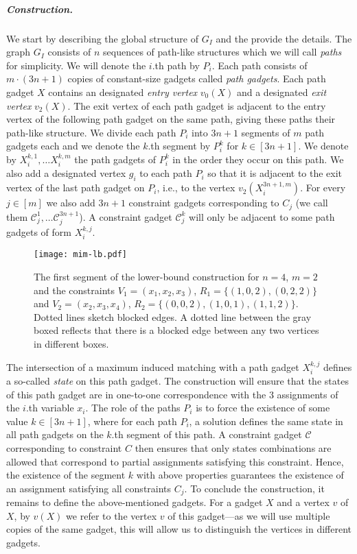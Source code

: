 \documentclass[a4paper,UKenglish,cleveref, autoref, thm-restate]{lipics-v2021}
\begin{document}
\subparagraph*{Construction.}

We start by describing the global structure of $G_I$ and the provide the details.
The graph $G_I$ consists of $n$ sequences of path-like structures which we will call \emph{paths} for simplicity.
We will denote the $i$.th path by $P_i$. 
Each path consists of $m\cdot(3n+1)$ copies of constant-size gadgets called \emph{path gadgets}. 
Each path gadget $X$ contains an designated \emph{entry vertex} $v_0(X)$ and a designated \emph{exit vertex} $v_2(X)$. The exit vertex of each path gadget is adjacent to the entry vertex of the following path gadget on the same path, giving these paths their path-like structure.
We divide each path $P_i$ into $3n+1$ segments of $m$ path gadgets each and we denote the $k$.th segment by $P_i^k$ for $k \in [3n+1]$. 
We denote by $X_i^{k,1},\dots X_i^{k, m}$ the path gadgets of $P_i^k$ in the order they occur on this path. 
We also add a designated vertex $g_i$ to each path $P_i$ so that it is adjacent to the exit vertex of the last path gadget on $P_i$, i.e., to the vertex $v_2(X_i^{3n+1,m})$.
For every $j \in [m]$ we also add $3n+1$ constraint gadgets corresponding to $C_j$ (we call them $\mathscr{C}_j^1, \dots \mathscr{C}_j^{3n+1}$). 
A constraint gadget $\mathscr{C}_j^k$ will only be adjacent to some path gadgets of form $X_i^{k, j}$. 

\begin{figure}[t]
    \centering
    \texttt{[image: mim-lb.pdf]}
    \caption{The first segment of the lower-bound construction for $n = 4$, $m = 2$ and the constraints $V_1 = (x_1, x_2, x_3)$, $R_1 = \{(1,0,2),(0,2,2)\}$ and $V_2 = (x_2, x_3, x_4)$, $R_2 = \{(0,0,2),(1,0,1),(1,1,2)\}$. Dotted lines sketch blocked edges. A dotted line between the gray boxed reflects that there is a blocked edge between any two vertices in different boxes. }  
    \label{fig:mim-lb}
\end{figure} 

The intersection of a maximum induced matching with a path gadget $X_i^{k,j}$ defines a so-called \emph{state} on this path gadget.
The construction will ensure that the states of this path gadget are in one-to-one correspondence with the $3$ assignments of the $i$.th variable $x_i$. 
The role of the paths $P_i$ is to force the existence of some value $k\in [3n+1]$, where for each path $P_i$, a solution defines the same state in all path gadgets on the $k$.th segment of this path.
A constraint gadget $\mathscr{C}$ corresponding to constraint $C$ then ensures that only states combinations are allowed that 
correspond to partial assignments satisfying this constraint. 
Hence, the existence of the segment $k$ with above properties guarantees the existence of an assignment satisfying all constraints $C_j$. To conclude the construction, it remains to define the above-mentioned gadgets.
For a gadget $X$ and a vertex $v$ of $X$, by $v(X)$ we refer to the vertex $v$ of this gadget---as we will use multiple copies of the same gadget, this will allow us to distinguish the vertices in different gadgets.
\end{document}
